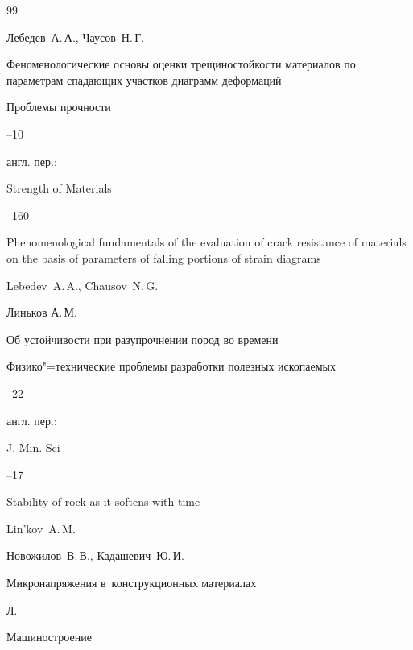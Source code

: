 \begin{thebibliography}{99}

\by Лебедев~А.\,А., Чаусов~Н.\,Г.

\paper Феноменологические основы оценки трещиностойкости материалов по параметрам спадающих участков диаграмм деформаций

\jour Проблемы прочности



--10

\transl англ. пер.:~

\jour Strength of Materials



--160


\paper Phenomenological fundamentals of the evaluation of crack resistance of materials on the basis of parameters of falling portions of strain diagrams

\by Lebedev~A.\,A., Chausov~N.\,G.






\by Линьков А.\,М.

\paper Об устойчивости при разупрочнении пород во времени

\jour Физико"=технические проблемы разработки полезных ископаемых



--22

\transl англ. пер.:~

\jour  J. Min. Sci



--17


\paper  Stability of rock as it softens with time

\by  Lin'kov~A.\,M.






\by Новожилов~В.\,В., Кадашевич~Ю.\,И.

\book Микронапряжения в~конструкционных материалах

\publaddr Л.

\publ Машиностроение


\end{thebibliography}
